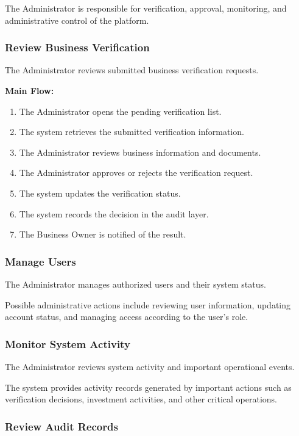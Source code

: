 The Administrator is responsible for verification, approval, monitoring,
and administrative control of the platform.

\subsubsection{Review Business Verification}

The Administrator reviews submitted business verification requests.

\textbf{Main Flow:}
\begin{enumerate}
    \item The Administrator opens the pending verification list.
    \item The system retrieves the submitted verification information.
    \item The Administrator reviews business information and documents.
    \item The Administrator approves or rejects the verification request.
    \item The system updates the verification status.
    \item The system records the decision in the audit layer.
    \item The Business Owner is notified of the result.
\end{enumerate}


\subsubsection{Manage Users}

The Administrator manages authorized users and their system status.

Possible administrative actions include reviewing user information,
updating account status, and managing access according to the user's role.


\subsubsection{Monitor System Activity}

The Administrator reviews system activity and important operational events.

The system provides activity records generated by important actions such as
verification decisions, investment activities, and other critical operations.


\subsubsection{Review Audit Records}

